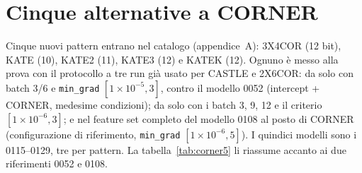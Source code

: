 \section{Cinque alternative a CORNER}

Cinque nuovi pattern entrano nel catalogo (appendice~A):
3X4COR (12 bit), KATE (10), KATE2 (11), KATE3 (12) e KATEK
(12). Ognuno è messo alla prova con il protocollo a tre run
già usato per CASTLE e 2X6COR: da solo con batch 3/6 e
\texttt{min\_grad} $[1\times10^{-5}, 3]$, contro il modello
0052 (intercept + CORNER, medesime condizioni); da solo con i
batch 3, 9, 12 e il criterio $[1\times10^{-6}, 3]$; e nel
feature set completo del modello 0108 al posto di CORNER
(configurazione di riferimento, \texttt{min\_grad}
$[1\times10^{-6}, 5]$). I quindici modelli sono i
0115--0129, tre per pattern. La tabella~\ref{tab:corner5} li
riassume accanto ai due riferimenti 0052 e 0108.


